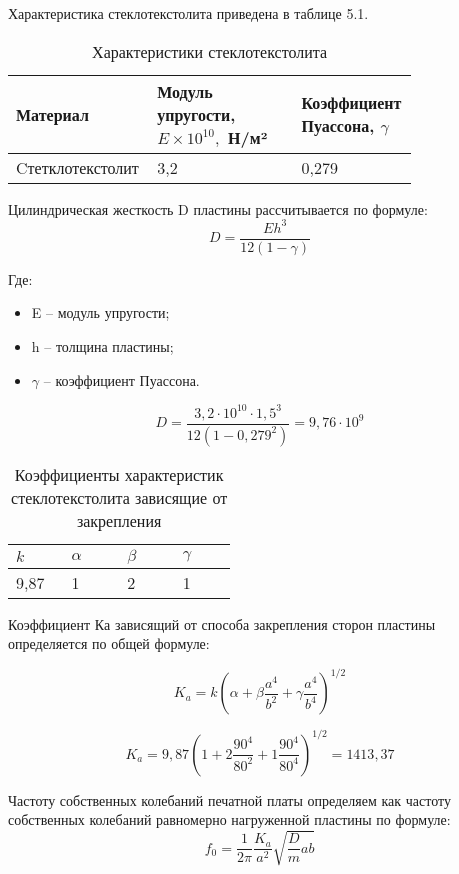 Характеристика стеклотекстолита приведена в таблице 5.1.

\begin{table}[H]
  \caption{Характеристики стеклотекстолита}
  \centering
  \begin{tabular}{|p{0.25\linewidth} | p{0.35\linewidth}| p{0.2\linewidth} |}
    \hline
    Материал & Модуль упругости, $E \times 10^{10},$ Н/м²& Коэффициент Пуассона, $\gamma$ \\
    \hline
    Cтетклотекстолит & 3,2 & 0,279 \\
    \hline
  \end{tabular}
\end{table}

Цилиндрическая жесткость D пластины рассчитывается по формуле:
\begin{equation}
  D = \frac{Eh^3}{12(1 - \gamma)}
\end{equation}

Где:
\begin{itemize}
\item E – модуль упругости;
\item h – толщина пластины;
\item $\gamma$ – коэффициент Пуассона.
\end{itemize}

$$D = \frac{3,2 \cdot 10^{10} \cdot 1,5^{3}}{12(1 - 0,279^2)}=9,76 \cdot 10^9$$

\begin{table}[H]
  \caption{Коэффициенты характеристик стеклотекстолита зависящие от закрепления}
  \centering
  \begin{tabular}{|p{0.2\linewidth}| p{0.2\linewidth} | p{0.2\linewidth}| p{0.2\linewidth}|}
    \hline
    $k$ & $\alpha$ & $\beta$ & $\gamma$ \\
    \hline
    9,87 & 1 & 2 & 1 \\
    \hline
  \end{tabular}
\end{table}

Коэффициент $Ка$ зависящий от способа закрепления сторон пластины
определяется по общей формуле:

\begin{equation}
  K_a=k\left(\alpha + \beta \frac{a^4}{b^2} + \gamma\frac{a^4}{b^4}\right)^{1/2}
\end{equation}

$$K_a=9,87 \left(1 +2\frac{90^4}{80^2} + 1\frac{90^4}{80^4}\right)^{1/2}=1413,37$$

Частоту собственных колебаний печатной платы определяем как частоту
собственных колебаний равномерно нагруженной пластины по формуле:
\begin{equation}
  f_0= \frac{1}{2\pi}\frac{K_a}{a^2}\sqrt{\frac{D}{m} ab}
\end{equation}

